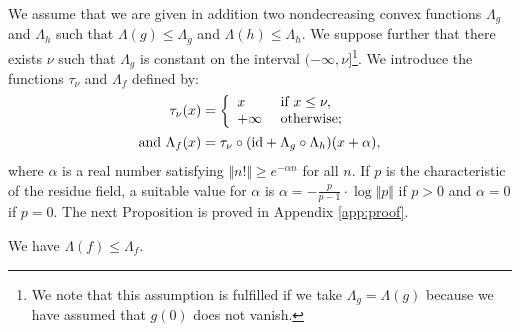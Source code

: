 \documentclass{sig-alternate-2013}
\newcommand{\id}{\textrm{id}}
\begin{document}
We assume that we are given in addition two nondecreasing convex 
functions $\Lambda_g$ and $\Lambda_h$ such that $\Lambda(g) \leq 
\Lambda_g$ and $\Lambda(h) \leq \Lambda_h$. We suppose further that 
there exists $\nu$ such that $\Lambda_g$ is constant on the interval 
$({-}\infty, \nu]$\footnote{We note that this assumption is fulfilled if 
we take $\Lambda_g = \Lambda(g)$ because we have assumed that $g(0)$ 
does not vanish.}. We introduce the functions $\tau_\nu$ and $\Lambda_f$ 
defined by:

\vspace{-0.2cm}

\begin{align*}
\tau_\nu(x) &= \smash{\left\{\begin{array}{ll} x & \mbox{ if } x \le \nu, \\
+\infty & \mbox{ otherwise;} \end{array}\right.} \\[8pt]
\mbox{and } \Lambda_f(x) &= \tau_\nu \circ (\id + \Lambda_g \circ \Lambda_h)(x + \alpha),
\end{align*}
where $\alpha$ is a real number satisfying $\Vert n! \Vert \geq 
e^{-\alpha n}$ for all $n$. If $p$ is the characteristic of the residue field,
a suitable value for $\alpha$ is $\alpha = - 
\frac p {p-1} \cdot \log \Vert p \Vert$ if $p > 0$ and $\alpha = 0$ if $p = 0$.
The next Proposition is proved in Appendix \ref{app:proof}.

\begin{prop}
\label{prop:boundLambdaf} \label{PROP:BOUNDLAMBDAF}
We have $\Lambda(f) \leq \Lambda_f$.
\end{prop}
\end{document}
